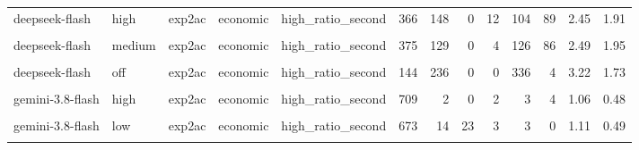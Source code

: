 \documentclass[
]{article}
\begin{document}
\begin{table}[!h]
{\begin{tabular}[t]{lllllrrrrrrrr}
deepseek-flash & high & exp2ac & economic & high\_ratio\_second & 366 & 148 & 0 & 12 & 104 & 89 & 2.45 & 1.91\\
\cellcolor{gray!10}{deepseek-flash} & \cellcolor{gray!10}{medium} & \cellcolor{gray!10}{exp2ac} & \cellcolor{gray!10}{economic} & \cellcolor{gray!10}{high\_ratio\_first} & \cellcolor{gray!10}{252} & \cellcolor{gray!10}{98} & \cellcolor{gray!10}{5} & \cellcolor{gray!10}{4} & \cellcolor{gray!10}{134} & \cellcolor{gray!10}{227} & \cellcolor{gray!10}{3.49} & \cellcolor{gray!10}{2.21}\\
deepseek-flash & medium & exp2ac & economic & high\_ratio\_second & 375 & 129 & 0 & 4 & 126 & 86 & 2.49 & 1.95\\
\addlinespace
\cellcolor{gray!10}{deepseek-flash} & \cellcolor{gray!10}{off} & \cellcolor{gray!10}{exp2ac} & \cellcolor{gray!10}{economic} & \cellcolor{gray!10}{high\_ratio\_first} & \cellcolor{gray!10}{66} & \cellcolor{gray!10}{162} & \cellcolor{gray!10}{0} & \cellcolor{gray!10}{0} & \cellcolor{gray!10}{202} & \cellcolor{gray!10}{290} & \cellcolor{gray!10}{4.36} & \cellcolor{gray!10}{1.87}\\
deepseek-flash & off & exp2ac & economic & high\_ratio\_second & 144 & 236 & 0 & 0 & 336 & 4 & 3.22 & 1.73\\
\cellcolor{gray!10}{gemini-3.8-flash} & \cellcolor{gray!10}{high} & \cellcolor{gray!10}{exp2ac} & \cellcolor{gray!10}{economic} & \cellcolor{gray!10}{high\_ratio\_first} & \cellcolor{gray!10}{599} & \cellcolor{gray!10}{10} & \cellcolor{gray!10}{5} & \cellcolor{gray!10}{17} & \cellcolor{gray!10}{51} & \cellcolor{gray!10}{38} & \cellcolor{gray!10}{1.65} & \cellcolor{gray!10}{1.51}\\
gemini-3.8-flash & high & exp2ac & economic & high\_ratio\_second & 709 & 2 & 0 & 2 & 3 & 4 & 1.06 & 0.48\\
\cellcolor{gray!10}{gemini-3.8-flash} & \cellcolor{gray!10}{low} & \cellcolor{gray!10}{exp2ac} & \cellcolor{gray!10}{economic} & \cellcolor{gray!10}{high\_ratio\_first} & \cellcolor{gray!10}{672} & \cellcolor{gray!10}{11} & \cellcolor{gray!10}{3} & \cellcolor{gray!10}{8} & \cellcolor{gray!10}{7} & \cellcolor{gray!10}{18} & \cellcolor{gray!10}{1.22} & \cellcolor{gray!10}{0.93}\\
\addlinespace
gemini-3.8-flash & low & exp2ac & economic & high\_ratio\_second & 673 & 14 & 23 & 3 & 3 & 0 & 1.11 & 0.49\\
\cellcolor{gray!10}{gemini-3.8-flash} & \cellcolor{gray!10}{medium} & \cellcolor{gray!10}{exp2ac} & \cellcolor{gray!10}{economic} & \cellcolor{gray!10}{high\_ratio\_first} & \cellcolor{gray!10}{646} & \cellcolor{gray!10}{28} & \cellcolor{gray!10}{4} & \cellcolor{gray!10}{4} & \cellcolor{gray!10}{18} & \cellcolor{gray!10}{20} & \cellcolor{gray!10}{1.31} & \cellcolor{gray!10}{1.06}\\

\end{tabular}}
\end{table}
\end{document}
